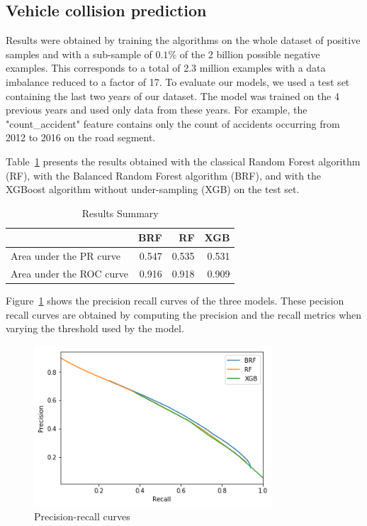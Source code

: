 \documentclass[conference]{IEEEtran}
\begin{document}
\subsection{Vehicle collision prediction}

Results were obtained by training the algorithms on the whole
dataset of positive samples and with a sub-sample of $0.1\%$ of the 2
billion possible negative examples. This corresponds to a total of 2.3
million examples with a data imbalance reduced to a factor of 17. To
evaluate our models, we used a test set containing the last two years of our
dataset. The model was trained on the 4 previous years and used only data
from these years. For example, the "count\_accident" feature contains only
the count of accidents occurring from 2012 to 2016 on the road segment.

Table~\ref{table:summary} presents the results obtained with the classical
Random Forest algorithm (RF), with the Balanced Random Forest algorithm (BRF), and with the XGBoost algorithm without under-sampling (XGB) on the test set.

\begin{table}[htbp]
\caption{Results Summary}
\begin{center}
\begin{tabular}{|l|r|r|r|}
\hline
                 &    BRF &    RF &    XGB \\
\hline
Area under the PR curve &  0.547 &  0.535 &  0.531 \\
Area under the ROC curve &  0.916 &  0.918 &  0.909 \\
\hline
\end{tabular}
\label{table:summary}
\end{center}
\end{table}

Figure~\ref{fig:precision-recall} shows the precision recall curves of the three models. These pecision recall curves are obtained by computing the precision and the recall metrics when varying the
threshold used by the model.

\begin{figure}[htbp]
\centerline{\includegraphics[height=6cm, keepaspectratio]{figures/pr.png}}
\caption{Precision-recall curves}
\label{fig:precision-recall}
\end{figure}
\end{document}
